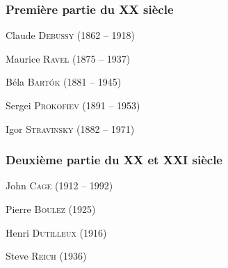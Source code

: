 \documentclass[11pt]{scrreprt}
\begin{document}
\subsubsection{Première partie du XX\ieme{} siècle}
\begin{description}
\item Claude \textsc{Debussy} (1862 -- 1918)
\item Maurice \textsc{Ravel} (1875 -- 1937)
\item Béla \textsc{Bartók} (1881 -- 1945)
\item Sergei \textsc{Prokofiev} (1891 -- 1953)
\item Igor \textsc{Stravinsky} (1882 -- 1971)
\end{description}

\subsubsection{Deuxième partie du XX\ieme{} et XXI\ieme{} siècle}
\begin{description}
\item John \textsc{Cage} (1912 -- 1992)
\item Pierre \textsc{Boulez} (1925)
\item Henri \textsc{Dutilleux} (1916)
\item Steve \textsc{Reich} (1936)
\end{description}

\printindex
\end{document}

